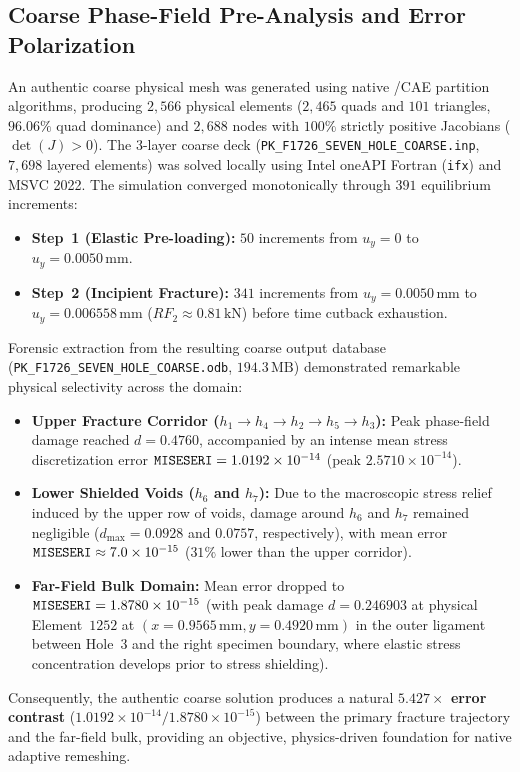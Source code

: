 \subsection{Coarse Phase-Field Pre-Analysis and Error Polarization}
\label{subsec:f1726_coarse_analysis}

An authentic coarse physical mesh was generated using native \Abaqus/CAE partition algorithms, producing $2{,}566$ physical elements ($2{,}465$ quads and $101$ triangles, $96.06\%$ quad dominance) and $2{,}688$ nodes with $100\%$ strictly positive Jacobians ($\det(J) > 0$). The 3-layer coarse deck (\texttt{PK\_F1726\_SEVEN\_HOLE\_COARSE.inp}, $7{,}698$ layered elements) was solved locally using Intel oneAPI Fortran (\texttt{ifx}) and MSVC 2022. The simulation converged monotonically through $391$ equilibrium increments:
\begin{itemize}
  \item \textbf{Step~1 (Elastic Pre-loading):} $50$ increments from $u_y = 0$ to $u_y = 0.0050\,\mathrm{mm}$.
  \item \textbf{Step~2 (Incipient Fracture):} $341$ increments from $u_y = 0.0050\,\mathrm{mm}$ to $u_y = 0.006558\,\mathrm{mm}$ ($RF_2 \approx 0.81\,\mathrm{kN}$) before time cutback exhaustion.
\end{itemize}

Forensic extraction from the resulting coarse output database (\texttt{PK\_F1726\_SEVEN\_HOLE\_COARSE.odb}, $194.3\,\mathrm{MB}$) demonstrated remarkable physical selectivity across the domain:
\begin{itemize}
  \item \textbf{Upper Fracture Corridor ($h_1 \to h_4 \to h_2 \to h_5 \to h_3$):} Peak phase-field damage reached $d = 0.4760$, accompanied by an intense mean stress discretization error $\texttt{MISESERI} = 1.0192 \times 10^{-14}$ (peak $2.5710 \times 10^{-14}$).
  \item \textbf{Lower Shielded Voids ($h_6$ and $h_7$):} Due to the macroscopic stress relief induced by the upper row of voids, damage around $h_6$ and $h_7$ remained negligible ($d_{\max} = 0.0928$ and $0.0757$, respectively), with mean error $\texttt{MISESERI} \approx 7.0 \times 10^{-15}$ ($31\%$ lower than the upper corridor).
  \item \textbf{Far-Field Bulk Domain:} Mean error dropped to $\texttt{MISESERI} = 1.8780 \times 10^{-15}$ (with peak damage $d = 0.246903$ at physical Element~$1252$ at $(x=0.9565\,\mathrm{mm}, y=0.4920\,\mathrm{mm})$ in the outer ligament between Hole~$3$ and the right specimen boundary, where elastic stress concentration develops prior to stress shielding).
\end{itemize}
Consequently, the authentic coarse solution produces a natural \textbf{$5.427\times$ error contrast} ($1.0192 \times 10^{-14} / 1.8780 \times 10^{-15}$) between the primary fracture trajectory and the far-field bulk, providing an objective, physics-driven foundation for native adaptive remeshing.

